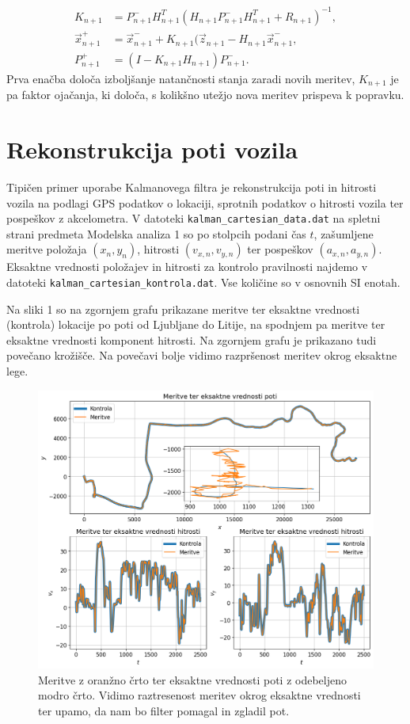 \documentclass[slovene,11pt,a4paper]{article}
\begin{document}
\begin{align}
K_{n+1} &= P_{n+1}^- H_{n+1}^T ( H_{n+1} P_{n+1}^- H_{n+1}^T + R_{n+1})^{-1}, \\
\vec{x}_{n+1}^+ &= \vec{x}_{n+1}^- + K_{n+1}(\vec{z}_{n+1} - H_{n+1}\vec{x}_{n+1}^-, \\
P_{n+1}^+ &= (I-K_{n+1}H_{n+1}) P_{n+1}^-.
\end{align}
Prva enačba določa izboljšanje natančnosti stanja zaradi novih meritev, $K_{n+1}$ je pa faktor ojačanja, ki določa, s kolikšno utežjo nova meritev prispeva k popravku.

\section{Rekonstrukcija poti vozila}

Tipičen primer uporabe Kalmanovega filtra je rekonstrukcija poti in hitrosti vozila na podlagi GPS podatkov o lokaciji, sprotnih podatkov o hitrosti vozila ter pospeškov z akcelometra. V datoteki \texttt{kalman\_cartesian\_data.dat} na spletni strani predmeta Modelska analiza 1 so po stolpcih podani čas $t$, zašumljene meritve položaja $(x_n, y_n)$, hitrosti $(v_{x,n}, v_{y,n})$ ter pospeškov $(a_{x,n}, a_{y,n})$. Eksaktne vrednosti položajev in hitrosti za kontrolo pravilnosti najdemo v datoteki \texttt{kalman\_cartesian\_kontrola.dat}. Vse količine so v osnovnih SI enotah.

Na sliki 1 so na zgornjem grafu prikazane meritve ter eksaktne vrednosti (kontrola) lokacije po poti od Ljubljane do Litije, na spodnjem pa meritve ter eksaktne vrednosti komponent hitrosti. Na zgornjem grafu je prikazano tudi povečano krožišče. Na povečavi bolje vidimo razpršenost meritev okrog eksaktne lege.

\begin{figure}[h!]
\centering
\includegraphics[width=14cm]{slika1.png}
\caption{Meritve z oranžno črto ter eksaktne vrednosti poti z odebeljeno modro črto. Vidimo raztresenost meritev okrog eksaktne vrednosti ter upamo, da nam bo filter pomagal in zgladil pot.}
\end{figure}
\end{document}
